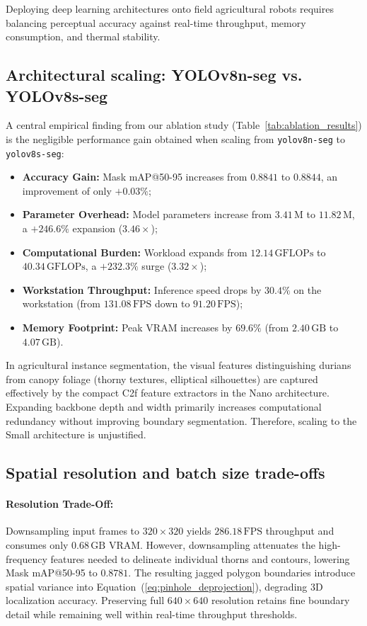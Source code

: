 \documentclass[12pt,a4paper]{article}
\begin{document}
Deploying deep learning architectures onto field agricultural robots requires balancing perceptual accuracy against real-time throughput, memory consumption, and thermal stability.

\subsection{Architectural scaling: YOLOv8n-seg vs. YOLOv8s-seg}
A central empirical finding from our ablation study (Table~\ref{tab:ablation_results}) is the negligible performance gain obtained when scaling from \texttt{yolov8n-seg} to \texttt{yolov8s-seg}:
\begin{itemize}
    \item \textbf{Accuracy Gain:} Mask mAP@50-95 increases from $0.8841$ to $0.8844$, an improvement of only \textbf{$+0.03\%$};
    \item \textbf{Parameter Overhead:} Model parameters increase from $3.41\,\text{M}$ to $11.82\,\text{M}$, a \textbf{$+246.6\%$} expansion ($3.46\times$);
    \item \textbf{Computational Burden:} Workload expands from $12.14\,\text{GFLOPs}$ to $40.34\,\text{GFLOPs}$, a \textbf{$+232.3\%$} surge ($3.32\times$);
    \item \textbf{Workstation Throughput:} Inference speed drops by $30.4\%$ on the workstation (from $131.08\,\text{FPS}$ down to $91.20\,\text{FPS}$);
    \item \textbf{Memory Footprint:} Peak VRAM increases by $69.6\%$ (from $2.40\,\text{GB}$ to $4.07\,\text{GB}$).
\end{itemize}
In agricultural instance segmentation, the visual features distinguishing durians from canopy foliage (thorny textures, elliptical silhouettes) are captured effectively by the compact C2f feature extractors in the Nano architecture. Expanding backbone depth and width primarily increases computational redundancy without improving boundary segmentation. Therefore, scaling to the Small architecture is unjustified.

\subsection{Spatial resolution and batch size trade-offs}
\paragraph{Resolution Trade-Off:}
Downsampling input frames to $320 \times 320$ yields $286.18\,\text{FPS}$ throughput and consumes only $0.68\,\text{GB}$ VRAM. However, downsampling attenuates the high-frequency features needed to delineate individual thorns and contours, lowering Mask mAP@50-95 to $0.8781$. The resulting jagged polygon boundaries introduce spatial variance into Equation~(\ref{eq:pinhole_deprojection}), degrading 3D localization accuracy. Preserving full $640 \times 640$ resolution retains fine boundary detail while remaining well within real-time throughput thresholds.
\end{document}
